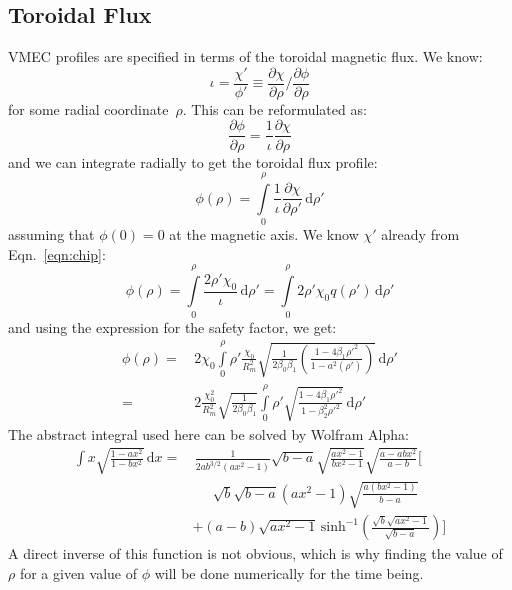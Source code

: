 \subsection{Toroidal Flux}
VMEC profiles are specified in terms of the toroidal magnetic flux.
We know:
\begin{equation}
 \iota = \frac{\chi'}{\phi'} \equiv \frac{\partial \chi}{\partial \rho} / \frac{\partial \phi}{\partial \rho}
\end{equation}
for some radial coordinate~$\rho$.
This can be reformulated as:
\begin{equation}
 \frac{\partial \phi}{\partial \rho} = \frac{1}{\iota} \frac{\partial \chi}{\partial \rho}
\end{equation}
and we can integrate radially to get the toroidal flux profile:
\begin{equation}
 \phi(\rho) = \int\limits_{0}^{\rho} \frac{1}{\iota} \frac{\partial \chi}{\partial \rho'} \,\mathrm{d}\rho'
\end{equation}
assuming that $\phi(0) = 0$ at the magnetic axis.
We know $\chi'$ already from Eqn.~\ref{eqn:chip}:
\begin{equation}
 \phi(\rho)
 = \int\limits_{0}^{\rho} \frac{2 \rho' \chi_0}{\iota} \,\mathrm{d}\rho'
 = \int\limits_{0}^{\rho} 2 \rho' \chi_0 q(\rho') \,\mathrm{d}\rho'
\end{equation}
and using the expression for the safety factor, we get:
\begin{align}
 \phi(\rho) =&\, 2 \chi_0 \int\limits_{0}^{\rho}
 \rho'
 \frac{\chi_0}{R_m^2}
 \sqrt{
   \frac{1}{2 \beta_0 \beta_1} \left( \frac{1 - 4 \beta_1 {\rho'}^2}{1 - a^2(\rho')} \right)
 }
 \,\mathrm{d}\rho' \nonumber \\
 =&\, 2 \frac{\chi_0^2}{R_m^2} \sqrt{\frac{1}{2 \beta_0 \beta_1}}
   \int\limits_{0}^{\rho}
     \rho'
     \sqrt{\frac{1 - 4 \beta_1 {\rho'}^2}{1 - \beta_2^2 {\rho'}^2}}
     \,\mathrm{d}\rho'
\end{align}
The abstract integral used here can be solved by Wolfram Alpha:
\begin{align}
 \int x \sqrt{\frac{1 - a x^2}{1 - b x^2}} \,\mathrm{d}x
 =&\,
 \frac{1}{2 a b^{3/2} (a x^2 - 1)}
 \sqrt{b - a}
 \sqrt{\frac{a x^2 - 1}{b x^2 - 1}}
 \sqrt{\frac{a - a b x^2}{a - b}}
 \Biggl[
 \nonumber \\
~& \phantom{+}~ \sqrt{b}
   \sqrt{b - a}
   (a x^2 - 1)
   \sqrt{\frac{a (b x^2 - 1)}{b - a}}
   \nonumber \\
~& + (a - b)
   \sqrt{a x^2 - 1}
   \,\mathrm{sinh}^{-1} \left(
     \frac{\sqrt{b} \sqrt{a x^2 - 1}}{\sqrt{b - a}}
   \right)
 \Biggr]
\end{align}
A direct inverse of this function is not obvious,
which is why finding the value of $\rho$ for a given value of $\phi$
will be done numerically for the time being.


